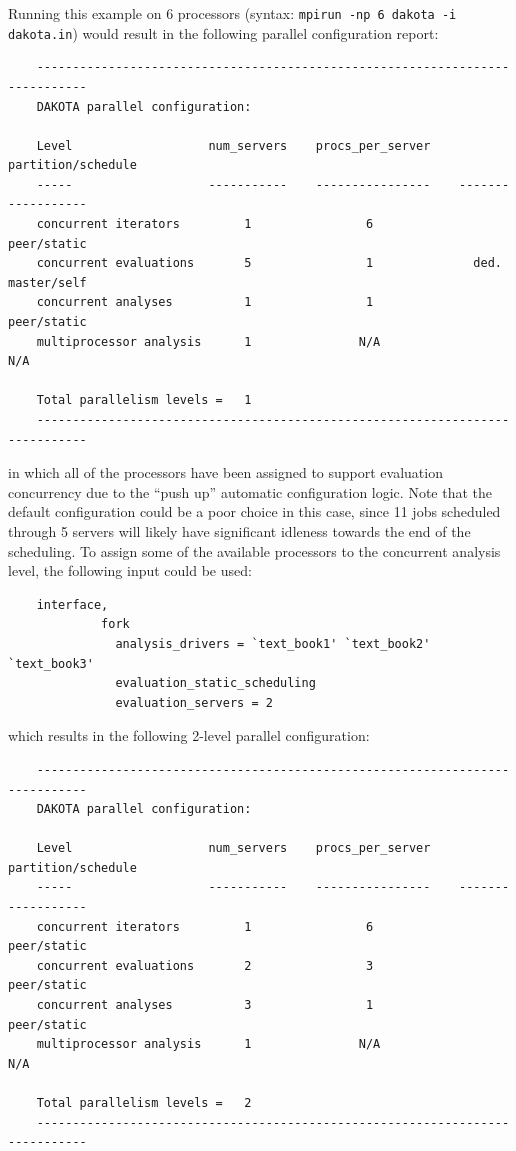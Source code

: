 Running this example on 6 processors (syntax: \texttt{mpirun -np 6
  dakota -i dakota.in}) would result in the following parallel
configuration report:
\begin{small}
\begin{verbatim}
    -----------------------------------------------------------------------------
    DAKOTA parallel configuration:

    Level                   num_servers    procs_per_server    partition/schedule
    -----                   -----------    ----------------    ------------------
    concurrent iterators         1                6              peer/static
    concurrent evaluations       5                1              ded. master/self
    concurrent analyses          1                1              peer/static
    multiprocessor analysis      1               N/A                N/A

    Total parallelism levels =   1
    -----------------------------------------------------------------------------
\end{verbatim}
\end{small}

in which all of the processors have been assigned to support
evaluation concurrency due to the ``push up'' automatic configuration
logic. Note that the default configuration could be a poor choice in
this case, since 11 jobs scheduled through 5 servers will likely have
significant idleness towards the end of the scheduling.  To assign
some of the available processors to the concurrent analysis level, the
following input could be used:
\begin{small}
\begin{verbatim}
    interface,
             fork
               analysis_drivers = `text_book1' `text_book2' `text_book3'
               evaluation_static_scheduling
               evaluation_servers = 2
\end{verbatim}
\end{small}

which results in the following 2-level parallel configuration:
\begin{small}
\begin{verbatim}
    -----------------------------------------------------------------------------
    DAKOTA parallel configuration:

    Level                   num_servers    procs_per_server    partition/schedule
    -----                   -----------    ----------------    ------------------
    concurrent iterators         1                6              peer/static
    concurrent evaluations       2                3              peer/static
    concurrent analyses          3                1              peer/static
    multiprocessor analysis      1               N/A                N/A

    Total parallelism levels =   2
    -----------------------------------------------------------------------------
\end{verbatim}
\end{small}

